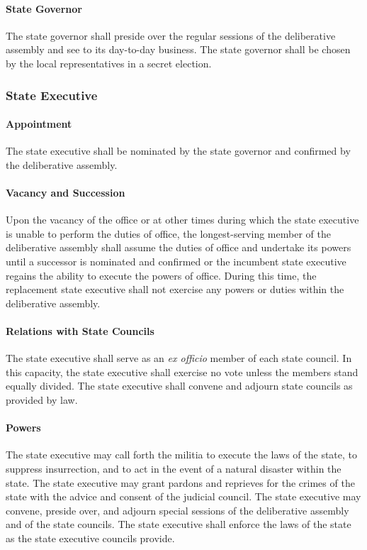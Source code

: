 \documentclass{article}
\begin{document}
\paragraph{State Governor}
The state governor shall preside over the regular sessions of the deliberative assembly and see to its day-to-day business. The state governor shall be chosen by the local representatives in a secret election.
\subsubsection{State Executive}
\paragraph{Appointment}
The state executive shall be nominated by the state governor and confirmed by the deliberative assembly.
\paragraph{Vacancy and Succession}
Upon the vacancy of the office or at other times during which the state executive is unable to perform the duties of office, the longest-serving member of the deliberative assembly shall assume the duties of office and undertake its powers until a successor is nominated and confirmed or the incumbent state executive regains the ability to execute the powers of office. During this time, the replacement state executive shall not exercise any powers or duties within the deliberative assembly.
\paragraph{Relations with State Councils}
The state executive shall serve as an \textit{ex officio} member of each state council. In this capacity, the state executive shall exercise no vote unless the members stand equally divided. The state executive shall convene and adjourn state councils as provided by law.
\paragraph{Powers}
The state executive may call forth the militia to execute the laws of the state, to suppress insurrection, and to act in the event of a natural disaster within the state. The state executive may grant pardons and reprieves for the crimes of the state with the advice and consent of the judicial council. The state executive may convene, preside over, and adjourn special sessions of the deliberative assembly and of the state councils. The state executive shall enforce the laws of the state as the state executive councils provide.
\end{document}
